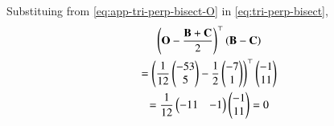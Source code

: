  \solution
Substituing  from 
			\eqref{eq:app-tri-perp-bisect-O} in 
			\eqref{eq:tri-perp-bisect},
\begin{multline}
	\left(\mathbf{O}-\frac{\mathbf{B}+\mathbf{C}}{2}\right)^{\top}\left(\mathbf{B}-\mathbf{C}\right)\\
	=\left(\frac{1}{12}\begin{pmatrix}-53\\5\end{pmatrix}- \frac{1}{2}\begin{pmatrix}-7\\1\end{pmatrix}\right)^{\top} \begin{pmatrix}-1\\11\end{pmatrix}\\
	=\frac{1}{12}\begin{pmatrix}-11&-1\end{pmatrix}\begin{pmatrix}-1\\11\end{pmatrix}
	=0
\end{multline}




